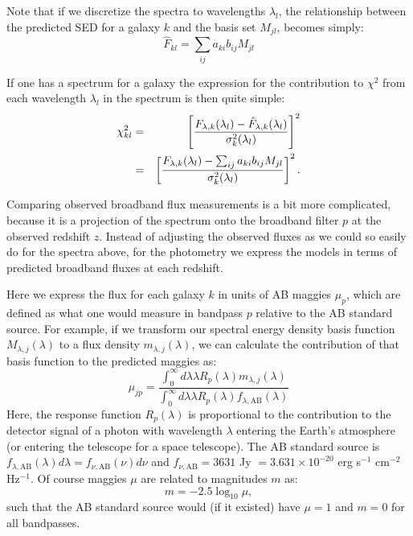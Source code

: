 \documentclass[10pt,preprint]{aastex}
\begin{document}
Note that if we discretize the spectra to wavelengths $\lambda_l$, the
relationship between the predicted SED for a galaxy $k$ and the basis
set $M_{jl}$, becomes simply:
\begin{equation}
\hat{F}_{kl} = \sum_{ij} a_{ki} b_{ij} M_{jl}
\end{equation}

If one has a spectrum for a galaxy the
expression for the contribution to $\chi^2$ from each wavelength
$\lambda_l$ in the spectrum is then quite simple:
\begin{eqnarray}
\label{chi2spec}
\chi_{kl}^2 &=& \left[\frac{F_{\lambda,k}(\lambda_l) -
{\hat{F}}_{\lambda,k}(\lambda_l)} 
{\sigma^2_k(\lambda_l)}\right]^2 \cr
&=&
\left[\frac{F_{\lambda,k}(\lambda_l) -
\sum_{ij} a_{ki} b_{ij} M_{jl}
}{\sigma^2_k(\lambda_l)}\right]^2. 
\end{eqnarray}

Comparing observed broadband flux measurements is a bit more
complicated, because it is a projection of the spectrum onto the
broadband filter $p$ at the observed redshift $z$. Instead of
adjusting the observed fluxes as we could so easily do for the spectra
above, for the photometry we express the models in terms of predicted
broadband fluxes at each redshift.

Here we express the flux for each galaxy $k$ in units of AB maggies
$\mu_p$, which are defined as what one would measure in bandpass $p$
relative to the AB standard source. For example, if we transform our
spectral energy density basis function $M_{\lambda, j}(\lambda)$ to a flux
density $m_{\lambda, j}(\lambda)$, we can calculate the contribution of
that basis function to the predicted maggies as:
\begin{equation}
\label{maggies}
\mu_{jp} = 
\frac{\int_0^{\infty} d\lambda \lambda R_p(\lambda) {m}_{\lambda, j}(\lambda)}
{\int_0^\infty d\lambda \lambda R_p(\lambda) f_{\lambda,
\mathrm{AB}}(\lambda) }
\end{equation}
Here, the response function $R_p(\lambda)$ is proportional to the
contribution to the detector signal of a photon with wavelength
$\lambda$ entering the Earth's atmosphere (or entering the telescope
for a space telescope). The AB standard source is $f_{\lambda,
\mathrm{AB}}(\lambda) d\lambda = f_{\nu,
\mathrm{AB}} (\nu) d\nu$ and $f_{\nu, \mathrm{AB}}=3631$ Jy $= 3.631 \times
10^{-20}$ erg s$^{-1}$ cm$^{-2}$ Hz$^{-1}$. Of course maggies $\mu$
are related to magnitudes $m$ as:
\begin{equation}
m = -2.5 \log_{10} \mu, 
\end{equation}
such that the AB standard source would (if it existed) have $\mu=1$
and $m=0$ for all bandpasses.
\end{document}
